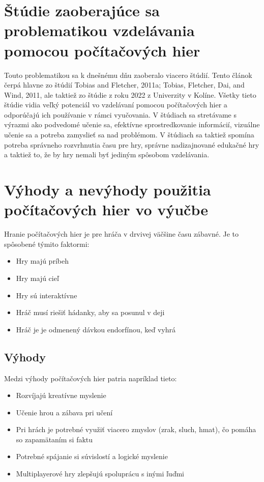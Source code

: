 \documentclass[10pt,twoside,slovak,a4paper]{article}
\begin{document}
\section{Štúdie zaoberajúce sa problematikou vzdelávania pomocou počítačových hier}\label{studie}
Touto problematikou sa k dnešnému dňu zaoberalo viacero štúdií. Tento článok čerpá hlavne zo štúdií Tobias and Fletcher, 2011a; Tobias, Fletcher, Dai, and Wind, 2011,\cite{strankazdroj1} ale taktiež zo štúdie z roku 2022 z Univerzity v Kolíne\cite{strankazdroj2}. Všetky tieto štúdie vidia veľký potenciál vo vzdelávaní pomocou počítačových hier a odporúčajú ich používanie v rámci vyučovania. V štúdiach sa stretávame s výrazmi ako podvedomé učenie sa, efektívne sprostredkovanie informácií, vizuálne učenie sa a potreba zamyslieť sa nad problémom. V štúdiach sa taktiež spomína potreba správneho rozvrhnutia času pre hry, správne nadizajnované edukačné hry a taktiež to, že by hry nemali byť jediným spôsobom vzdelávania.


\section{Výhody a nevýhody použitia počítačových hier vo výučbe} \label{vyhodynevyhodyhier}

Hranie počítačových hier je pre hráča v drvivej väčšine času zábavné. Je to spôsobené týmito faktormi:
\begin{itemize}
\item Hry majú príbeh
\item Hry majú cieľ
\item Hry sú interaktívne
\item Hráč musí riešiť hádanky, aby sa posunul v deji
\item Hráč je je odmenený dávkou endorfínou, keď vyhrá
\end{itemize}


\subsection{Výhody}\label{vyhodynevyhodyhier:vyhody} 
Medzi výhody počítačových hier patria napríklad tieto:
\begin{itemize}
\item Rozvíjajú kreatívne myslenie
\item Učenie hrou a zábava pri učení
\item Pri hrách je potrebné využiť viacero zmyslov (zrak, sluch, hmat), čo pomáha so zapamätaním si faktu
\item Potrebné spájanie si súvislostí a logické myslenie
\item Multiplayerové hry zlepšujú spoluprácu s inými ľuďmi
\end{itemize}
\end{document}
